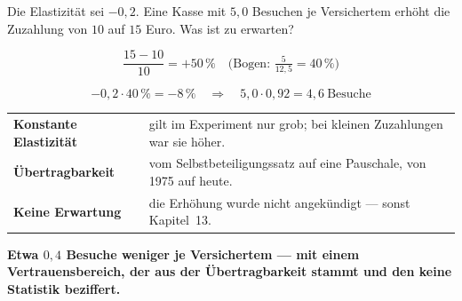 \begin{aufgabe}
Die Elastizität sei $-0{,}2$. Eine Kasse mit $5{,}0$ Besuchen je Versichertem erhöht die Zuzahlung von $10$ auf $15$ Euro. Was ist zu erwarten?

\loesung
{}
\[ \frac{15-10}{10} = +50\,\% \quad\text{(Bogen: } \tfrac{5}{12{,}5} = 40\,\%\text{)} \]

\[ -0{,}2\cdot40\,\% = -8\,\% \quad\Longrightarrow\quad 5{,}0\cdot0{,}92 = 4{,}6 \ \text{Besuche} \]

\begin{center}
{\small
\renewcommand{\arraystretch}{1.5}
\begin{tabular}{@{}P{2.8cm}P{5.8cm}@{}}
\toprule
\textbf{Konstante Elastizität} & gilt im Experiment nur grob; bei kleinen Zuzahlungen war sie höher.\\
\textbf{Übertragbarkeit} & vom Selbstbeteiligungssatz auf eine Pauschale, von 1975 auf heute.\\
\textbf{Keine Erwartung} & die Erhöhung wurde nicht angekündigt --- sonst Kapitel~13.\\
\bottomrule
\end{tabular}}
\end{center}

\begin{center}
\begin{minipage}{0.9\textwidth}
\textbf{Etwa $0{,}4$ Besuche weniger je Versichertem --- mit einem Vertrauensbereich, der aus der Übertragbarkeit stammt und den keine Statistik beziffert.}
\end{minipage}
\end{center}

\begin{center}
\begin{minipage}{0.88\textwidth}
\end{minipage}
\end{center}
\end{aufgabe}

